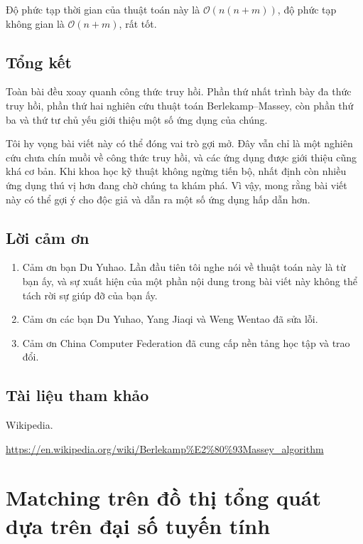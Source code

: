 \documentclass[11pt]{article}
\newcommand{\Oh}{\mathcal{O}}
\begin{document}
Độ phức tạp thời gian của thuật toán này là \(\Oh(n(n+m))\), độ phức tạp không
gian là \(\Oh(n+m)\), rất tốt.

\subsection{Tổng kết}

Toàn bài đều xoay quanh công thức truy hồi. Phần thứ nhất trình bày đa thức
truy hồi, phần thứ hai nghiên cứu thuật toán Berlekamp--Massey, còn phần thứ
ba và thứ tư chủ yếu giới thiệu một số ứng dụng của chúng.

Tôi hy vọng bài viết này có thể đóng vai trò gợi mở. Đây vẫn chỉ là một nghiên
cứu chưa chín muồi về công thức truy hồi, và các ứng dụng được giới thiệu cũng
khá cơ bản. Khi khoa học kỹ thuật không ngừng tiến bộ, nhất định còn nhiều ứng
dụng thú vị hơn đang chờ chúng ta khám phá. Vì vậy, mong rằng bài viết này có
thể gợi ý cho độc giả và dẫn ra một số ứng dụng hấp dẫn hơn.

\subsection*{Lời cảm ơn}

\begin{enumerate}
  \item Cảm ơn bạn Du Yuhao. Lần đầu tiên tôi nghe nói về thuật toán này là từ
  bạn ấy, và sự xuất hiện của một phần nội dung trong bài viết này không thể
  tách rời sự giúp đỡ của bạn ấy.
  \item Cảm ơn các bạn Du Yuhao, Yang Jiaqi và Weng Wentao đã sửa lỗi.
  \item Cảm ơn China Computer Federation đã cung cấp nền tảng học tập và trao
  đổi.
\end{enumerate}

\subsection*{Tài liệu tham khảo}

\begin{enumerate}[label={[\arabic*]}]
  \item Wikipedia.

  \url{https://en.wikipedia.org/wiki/Berlekamp%E2%80%93Massey_algorithm}
\end{enumerate}

\section{Matching trên đồ thị tổng quát dựa trên đại số tuyến tính}
\end{document}
